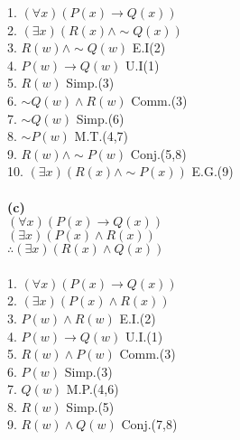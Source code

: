 \documentclass{article}
\begin{document}
1. $(\forall x)(P(x) \rightarrow Q(x))$ \\
2. $(\exists x)(R(x) \wedge \sim Q(x))$ \\
3. $R(w) \wedge \sim Q(w)$  \hspace*{\fill} E.I(2) \\
4. $P(w) \rightarrow Q(w)$ \hspace*{\fill} U.I(1) \\
5. $R(w)$ \hspace*{\fill} Simp.(3) \\
6. $\sim Q(w) \wedge R(w) $ \hspace*{\fill} Comm.(3) \\
7. $\sim Q(w)$ \hspace*{\fill} Simp.(6) \\
8. $\sim P(w)$ \hspace*{\fill} M.T.(4,7) \\
9. $R(w) \wedge \sim P(w)$ \hspace*{\fill} Conj.(5,8) \\
10. $(\exists x)(R(x) \wedge \sim P(x))$ \hspace*{\fill} E.G.(9) \\\\
\textbf{(c)} \\
$(\forall x)(P(x) \rightarrow Q(x))$ \\
\underline{$(\exists x)(P(x) \wedge R(x))$} \\
$\therefore (\exists x)(R(x) \wedge Q(x))$\\\\
1. $(\forall x)(P(x) \rightarrow Q(x))$ \\
2. $(\exists x)(P(x) \wedge R(x))$ \\
3. $P(w) \wedge R(w)$ \hspace*{\fill} E.I.(2) \\
4. $P(w) \rightarrow Q(w)$ \hspace*{\fill} U.I.(1) \\
5. $R(w) \wedge P(w)$ \hspace*{\fill} Comm.(3) \\
6. $P(w)$ \hspace*{\fill} Simp.(3) \\
7. $Q(w)$ \hspace*{\fill} M.P.(4,6) \\
8. $R(w)$ \hspace*{\fill} Simp.(5) \\
9. $R(w) \wedge Q(w)$ \hspace*{\fill} Conj.(7,8) \\
\end{document}
